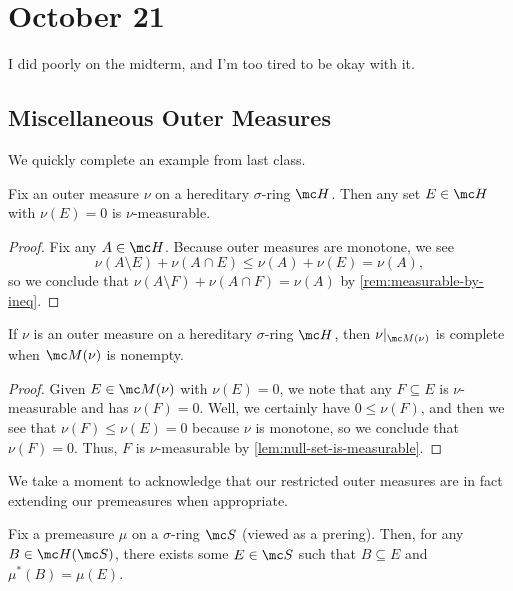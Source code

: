 \documentclass[../notes.tex]{subfiles}
\begin{document}
\section{October 21}

I did poorly on the midterm, and I'm too tired to be okay with it.

\subsection{Miscellaneous Outer Measures}
We quickly complete an example from last class.
\begin{lemma} \label{lem:null-set-is-measurable}
	Fix an outer measure $\nu$ on a hereditary $\sigma$-ring $\mc H$. Then any set $E\in\mc H$ with $\nu(E)=0$ is $\nu$-measurable.
\end{lemma}
\begin{proof}
	Fix any $A\in\mc H$. Because outer measures are monotone, we see
	\[\nu(A\setminus E)+\nu(A\cap E)\le\nu(A)+\nu(E)=\nu(A),\]
	so we conclude that $\nu(A\setminus F)+\nu(A\cap F)=\nu(A)$ by \autoref{rem:measurable-by-ineq}.
\end{proof}
\begin{lemma}
	If $\nu$ is an outer measure on a hereditary $\sigma$-ring $\mc H$, then $\nu|_{\mc M(\nu)}$ is complete when $\mc M(\nu)$ is nonempty.
\end{lemma}
\begin{proof}
	Given $E\in\mc M(\nu)$ with $\nu(E)=0$, we note that any $F\subseteq E$ is $\nu$-measurable and has $\nu(F)=0$. Well, we certainly have $0\le\nu(F)$, and then we see that $\nu(F)\le\nu(E)=0$ because $\nu$ is monotone, so we conclude that $\nu(F)=0$. Thus, $F$ is $\nu$-measurable by \autoref{lem:null-set-is-measurable}.
\end{proof}
We take a moment to acknowledge that our restricted outer measures are in fact extending our premeasures when appropriate.
\begin{lemma}
	Fix a premeasure $\mu$ on a $\sigma$-ring $\mc S$ (viewed as a prering). Then, for any $B\in\mc H(\mc S)$, there exists some $E\in\mc S$ such that $B\subseteq E$ and $\mu^*(B)=\mu(E)$.
\end{lemma}
\end{document}
